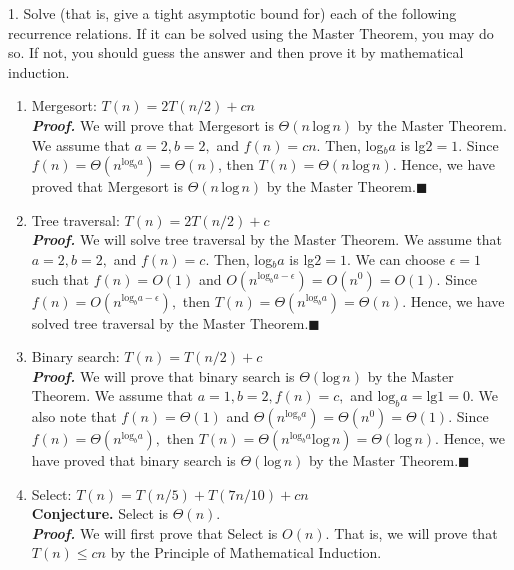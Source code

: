 \documentclass{article}
\begin{document}
1. Solve (that is, give a tight asymptotic bound for) each of the following recurrence relations. If it can be solved using the Master Theorem, you may do so. If not, you should guess the answer and then prove it by mathematical induction.\\
\begin{enumerate}[leftmargin=35px,label=(\textbf{\alph*})]
\item Mergesort: $T(n) = 2T(n/2) + cn$\\
\textit{\textbf{Proof.}} We will prove that Mergesort is $\Theta(n \, \text{log} \,n)$ by the Master Theorem. We assume that $a = 2, b = 2,$ and $f(n) = cn$. Then, log$_b a$ is lg$2 = 1$. Since $f(n) = \Theta(n^{\text{log}_b a}) = \Theta(n)$, then $T(n) = \Theta(n \, \text{log} \,n)$. Hence, we have proved that Mergesort is $\Theta(n \, \text{log} \,n)$ by the Master Theorem.\hfill$\blacksquare$

\item Tree traversal: $T(n) = 2T(n/2) + c$\\
\textit{\textbf{Proof.}} We will solve tree traversal by the Master Theorem. We assume that $a = 2, b = 2,$ and $f(n) = c$. Then, log$_b a$ is lg$2 = 1$. We can choose $\epsilon = 1$ such that $f(n) = O(1)$ and $O(n^{\text{log}_b a - \epsilon}) = O(n^0) = O(1).$ Since $f(n) = O(n^{\text{log}_b a - \epsilon}),$ then $T(n) = \Theta(n^{\text{log}_b a}) = \Theta(n)$. Hence, we have solved tree traversal by the Master Theorem.\hfill$\blacksquare$
\item Binary search: $T(n) = T(n/2) + c$\\
\textit{\textbf{Proof.}} We will prove that binary search is $\Theta(\text{log} \, n)$ by the Master Theorem. We assume that $a = 1, b = 2, f(n) = c,$ and $\text{log}_b a = \text{lg} 1 = 0.$ We also note that $f(n) = \Theta(1)$ and $\Theta(n^{\text{log}_b a}) = \Theta(n^0) = \Theta(1).$ Since $f(n) = \Theta(n^{\text{log}_b a}),$ then $T(n) = \Theta(n^{\text{log}_b a} \text{log} \, n) = \Theta(\text{log} \, n).$ Hence, we have proved that binary search is $\Theta(\text{log} \, n)$ by the Master Theorem.\hfill$\blacksquare$
\item Select: $T(n) = T(n/5) + T(7n/10) + cn$\\
\textbf{Conjecture.} Select is $\Theta(n)$.\\
\textit{\textbf{Proof.}} We will first prove that Select is $O(n)$. That is, we will prove that $T(n) \leq cn$ by the Principle of Mathematical Induction.\\


\end{enumerate}
\end{document}
